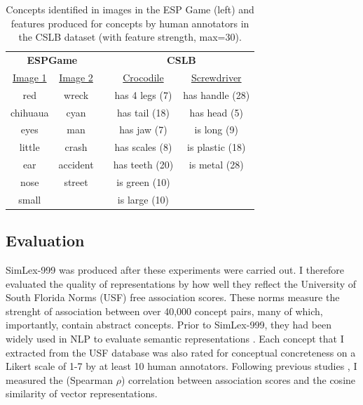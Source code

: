 \begin{table}[t]\begin{center}\begin{tabular}{c|ccc|c}


\multicolumn{2}{c}{\bf ESPGame} &\multicolumn{1}{c}{} & \multicolumn{2}{c}{\bf CSLB}\\
 \underline{Image 1} &  \underline{Image 2} & &  \underline{Crocodile} & \underline{Screwdriver} \\ 
\footnotesize{red} &  \footnotesize{wreck} &  &  \footnotesize{has 4 legs (7)} &  \footnotesize{has handle (28)} \\ 
\footnotesize{chihuaua} &  \footnotesize{cyan} & &  \footnotesize{has tail (18)} &  \footnotesize{has head (5)} \\ 
\footnotesize{eyes} &  \footnotesize{man} & &  \footnotesize{has jaw (7)} & \footnotesize{is long (9)} \\ 
\footnotesize{little} &  \footnotesize{crash} & &  \footnotesize{has scales (8)} &   \footnotesize{is plastic (18)} \\ 
\footnotesize{ear} &  \footnotesize{accident} & &  \footnotesize{has teeth (20)} & \footnotesize{is metal (28)} \\ 
\footnotesize{nose}  &  \footnotesize{street} & &  \footnotesize{is green (10}) &  \\ 
\footnotesize{small} &   & & \footnotesize{is large (10)} &    \\ 






\end{tabular}\end{center}\caption{\label{font-table} Concepts identified in images in the ESP Game (left) and features produced for concepts by human annotators in the CSLB dataset (with feature strength, max=30).}\end{table}







\subsection{Evaluation}

SimLex-999 was produced after these experiments were carried out. I therefore evaluated the quality of representations by how well they reflect the University of South Florida Norms (USF) \citep{nelson2004university} free association scores. These norms measure the strenght of association between over 40,000 concept pairs, many of which, importantly, contain abstract concepts. Prior to SimLex-999, they had been widely used in NLP to evaluate semantic representations \citep{andrews2009integrating,feng2010visual,silberer2012grounded,rollermultimodal}. Each concept that I extracted from the USF database was also rated for conceptual concreteness on a Likert scale of 1-7 by at least 10 human annotators. Following previous studies \citep{huang2012improving,silberer2012grounded}, I measured the (Spearman \(\rho\)) correlation between association scores and the cosine similarity of vector representations.

